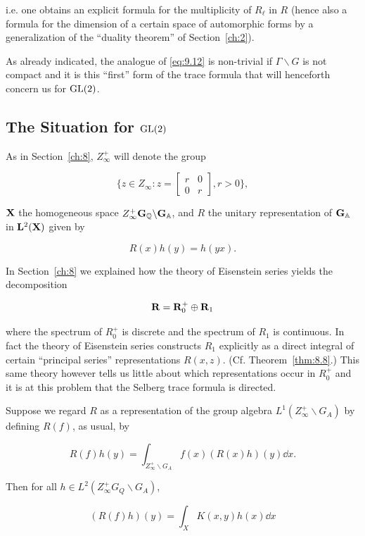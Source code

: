 i.e. one obtains an explicit formula for the multiplicity of $R_\ell$ in $R$ (hence also a formula for the dimension of a certain space of automorphic forms by a generalization of the ``duality theorem'' of Section~\ref{ch:2}).

As already indicated, the analogue of \eqref{eq:9.12} is non-trivial if $\Gamma \backslash G$ is not compact and it is this ``first'' form of the trace formula that will henceforth concern us for $\operatorname{GL}(2)$.

\subsection{The Situation for \texorpdfstring{$\operatorname{GL}(2)$}{GL(2)}}

As in Section~\ref{ch:8}, $Z_\infty^{+}$ will denote the group

\[
\{z \in Z_\infty: z = \begin{bmatrix} r & 0 \\ 0 & r \end{bmatrix}, r > 0\},
\]

$\mathbf{X}$ the homogeneous space $Z_\infty^{+}\mathbf{G}_{\mathbb{Q}} \backslash \mathbf{G}_{\mathbb{A}}$, and $R$ the unitary representation of $\mathbf{G}_{\mathbb{A}}$ in $\mathbf{L}^2(\mathbf{X})$ given by

\[
R(x)h(y) = h(yx).
\]

In Section~\ref{ch:8} we explained how the theory of Eisenstein series yields the decomposition

\[
\mathbf{R} = \mathbf{R}_0^{+} \oplus \mathbf{R}_1
\]

where the spectrum of $R_0^{+}$ is discrete and the spectrum of $R_1$ is continuous. In fact the theory of Eisenstein series constructs $R_1$ explicitly as a direct integral of certain ``principal series'' representations $R(x,z)$. (Cf. Theorem~\ref{thm:8.8}.) This same theory however tells us little about which representations occur in $R_0^{+}$ and it is at this problem that the Selberg trace formula is directed.

Suppose we regard $R$ as a representation of the group algebra $L^1(Z_\infty^{+} \backslash G_A)$ by defining $R(f)$, as usual, by

\[
R(f)h(y) = \int_{Z_\infty^{+} \backslash G_A} f(x)(R(x)h)(y)\dd x.
\]

Then for all $h \in L^2(Z_\infty^{+}G_Q \backslash G_A)$,

\begin{equation}\label{eq:9.18}
(R(f)h)(y) = \int_X K(x, y)h(x)\dd x\tag{9.18}
\end{equation}

